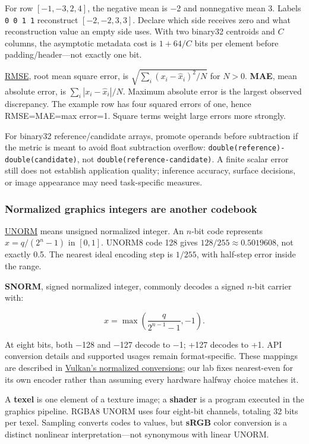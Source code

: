 For row \([-1,-3,2,4]\), the negative mean is −2 and nonnegative mean 3. Labels \texttt{0\ 0\ 1\ 1} reconstruct \([-2,-2,3,3]\). Declare which side receives zero and what reconstruction value an empty side uses. With two binary32 centroids and \(C\) columns, the asymptotic metadata cost is \(1+64/C\) bits per element before padding/header---not exactly one bit.

\hyperref[appendix-537171d69d27]{RMSE}, root mean square error, is \(\sqrt{\sum_i(x_i-\widehat x_i)^2/N}\) for \(N>0\). \textbf{MAE}, mean absolute error, is \(\sum_i|x_i-\widehat x_i|/N\). Maximum absolute error is the largest observed discrepancy. The example row has four squared errors of one, hence RMSE=MAE=max error=1. Square terms weight large errors more strongly.

For binary32 reference/candidate arrays, promote operands before subtraction if the metric is meant to avoid float subtraction overflow: \texttt{double(reference)-double(candidate)}, not \texttt{double(reference-candidate)}. A finite scalar error still does not establish application quality; inference accuracy, surface decisions, or image appearance may need task-specific measures.

\subsubsection{Normalized graphics integers are another codebook}\label{05-engine-i-ch001-normalized-graphics-integers-are-another-codebook}

\hyperref[appendix-b2402c453dac]{UNORM} means unsigned normalized integer. An \(n\)-bit code represents \(x=q/(2^n-1)\) in \([0,1]\). UNORM8 code 128 gives \(128/255\approx0.5019608\), not exactly 0.5. The nearest ideal encoding step is \(1/255\), with half-step error inside the range.

\textbf{SNORM}, signed normalized integer, commonly decodes a signed \(n\)-bit carrier with:

\[
x=\max\!\left(\frac{q}{2^{n-1}-1},-1\right).
\]

At eight bits, both −128 and −127 decode to −1; +127 decodes to +1. API conversion details and supported usages remain format-specific. These mappings are described in \href{https://docs.vulkan.org/spec/latest/chapters/fundamentals.html\#fundamentals-fixedfpconv}{Vulkan's normalized conversions}; our lab fixes nearest-even for its own encoder rather than assuming every hardware halfway choice matches it.

A \textbf{texel} is one element of a texture image; a \textbf{shader} is a program executed in the graphics pipeline. RGBA8 UNORM uses four eight-bit channels, totaling 32 bits per texel. Sampling converts codes to values, but \textbf{sRGB} color conversion is a distinct nonlinear interpretation---not synonymous with linear UNORM.

